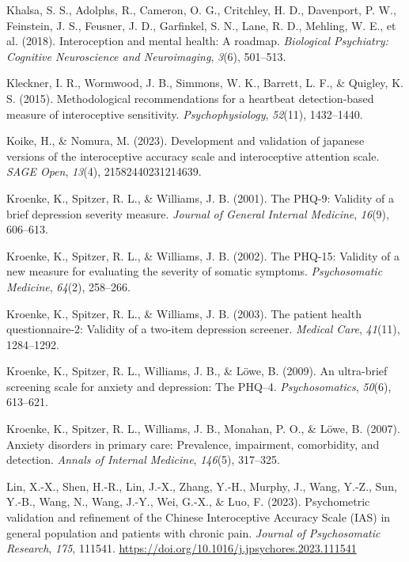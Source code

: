 \documentclass[
  jou,
  floatsintext,
  longtable,
  nolmodern,
  notxfonts,
  notimes,
  colorlinks=true,linkcolor=blue,citecolor=blue,urlcolor=blue]{apa7}
\newlength{\cslhangindent}
\newenvironment{CSLReferences}[2] %
 {\begin{list}{}{%
  \setlength{\itemindent}{0pt}
  \setlength{\leftmargin}{0pt}
  \setlength{\parsep}{0pt}
  \ifodd #1
   \setlength{\leftmargin}{\cslhangindent}
   \setlength{\itemindent}{-1\cslhangindent}
  \fi
  \setlength{\itemsep}{#2\baselineskip}}}
 {\end{list}}
\begin{document}
\begin{CSLReferences}{1}{0}
Khalsa, S. S., Adolphs, R., Cameron, O. G., Critchley, H. D., Davenport,
P. W., Feinstein, J. S., Feusner, J. D., Garfinkel, S. N., Lane, R. D.,
Mehling, W. E., et al. (2018). Interoception and mental health: A
roadmap. \emph{Biological Psychiatry: Cognitive Neuroscience and
Neuroimaging}, \emph{3}(6), 501--513.

Kleckner, I. R., Wormwood, J. B., Simmons, W. K., Barrett, L. F., \&
Quigley, K. S. (2015). Methodological recommendations for a heartbeat
detection-based measure of interoceptive sensitivity.
\emph{Psychophysiology}, \emph{52}(11), 1432--1440.

Koike, H., \& Nomura, M. (2023). Development and validation of japanese
versions of the interoceptive accuracy scale and interoceptive attention
scale. \emph{SAGE Open}, \emph{13}(4), 21582440231214639.

Kroenke, K., Spitzer, R. L., \& Williams, J. B. (2001). The PHQ-9:
Validity of a brief depression severity measure. \emph{Journal of
General Internal Medicine}, \emph{16}(9), 606--613.

Kroenke, K., Spitzer, R. L., \& Williams, J. B. (2002). The PHQ-15:
Validity of a new measure for evaluating the severity of somatic
symptoms. \emph{Psychosomatic Medicine}, \emph{64}(2), 258--266.

Kroenke, K., Spitzer, R. L., \& Williams, J. B. (2003). The patient
health questionnaire-2: Validity of a two-item depression screener.
\emph{Medical Care}, \emph{41}(11), 1284--1292.

Kroenke, K., Spitzer, R. L., Williams, J. B., \& Löwe, B. (2009). An
ultra-brief screening scale for anxiety and depression: The PHQ--4.
\emph{Psychosomatics}, \emph{50}(6), 613--621.

Kroenke, K., Spitzer, R. L., Williams, J. B., Monahan, P. O., \& Löwe,
B. (2007). Anxiety disorders in primary care: Prevalence, impairment,
comorbidity, and detection. \emph{Annals of Internal Medicine},
\emph{146}(5), 317--325.

Lin, X.-X., Shen, H.-R., Lin, J.-X., Zhang, Y.-H., Murphy, J., Wang,
Y.-Z., Sun, Y.-B., Wang, N., Wang, J.-Y., Wei, G.-X., \& Luo, F. (2023).
Psychometric validation and refinement of the Chinese Interoceptive
Accuracy Scale (IAS) in general population and patients with chronic
pain. \emph{Journal of Psychosomatic Research}, \emph{175}, 111541.
\url{https://doi.org/10.1016/j.jpsychores.2023.111541}


\end{CSLReferences}
\end{document}
